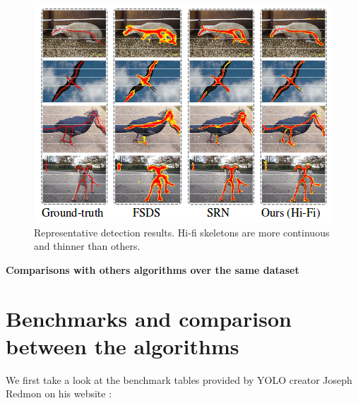 \documentclass[10pt]{article}
\begin{document}
    \begin{figure}[H]
  	\centering
    \includegraphics[scale=0.8]{HifiSkeleton.png}
    \caption{Representative detection results. Hi-fi skeletons are more continuous and thinner than others.}
\end{figure}




















\textbf{Comparisons with others algorithms over the same dataset}\\


\section{Benchmarks and comparison between the algorithms}

We first take a look at the benchmark tables provided by YOLO creator Joseph Redmon on his website : 
\end{document}

